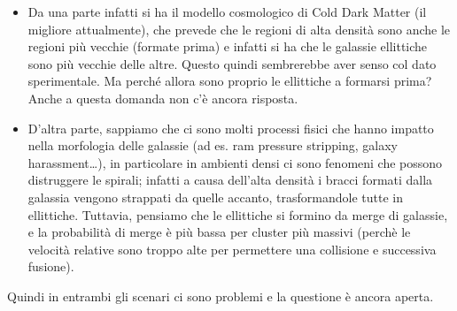 \begin{itemize}
	\item Da una parte infatti si ha il modello cosmologico di Cold Dark Matter (il migliore attualmente), che prevede che le regioni di alta densità sono anche le regioni più vecchie (formate prima) e infatti si ha che le galassie ellittiche sono più vecchie delle altre. Questo quindi sembrerebbe aver senso col dato sperimentale. Ma perché allora sono proprio le ellittiche a formarsi prima? Anche a questa domanda non c’è ancora risposta.
	\item D’altra parte, sappiamo che ci sono molti processi fisici che hanno impatto nella morfologia delle galassie (ad es. ram pressure stripping, galaxy harassment…), in particolare in ambienti densi ci sono fenomeni che possono distruggere le spirali; infatti a causa dell'alta densità i bracci formati dalla galassia vengono strappati da quelle accanto, trasformandole tutte in ellittiche. Tuttavia, pensiamo che le ellittiche si formino da merge di galassie, e la probabilità di merge è più bassa per cluster più massivi (perchè le velocità relative sono troppo alte per permettere una collisione e successiva fusione).
\end{itemize}

Quindi in entrambi gli scenari ci sono problemi e la questione è ancora aperta.

